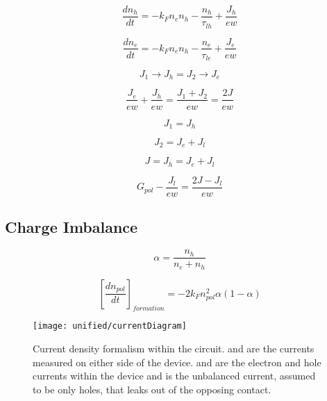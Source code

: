 \documentclass[../thesis.tex]{subfiles}
\begin{document}
\begin{equation}
\frac{dn_h}{dt}=-k_Fn_en_h-\frac{n_h}{\tau_{lh}}+\frac{J_h}{ew}
\label{eqn:hole_rate}
\end{equation}

\begin{equation}
\frac{dn_e}{dt}=-k_Fn_en_h-\frac{n_e}{\tau_{le}}+\frac{J_e}{ew}
\label{eqn:electron_rate}
\end{equation}

\begin{equation}
J_1\rightarrow J_h = J_2 \rightarrow J_e
\label{eqn:current_no_leakage}
\end{equation}

\begin{equation}
\frac{J_e}{ew}+\frac{J_h}{ew}=\frac{J_1+J_2}{ew}=\frac{2J}{ew}
\label{eqn:injected_polarons_no_leakage}
\end{equation}

\begin{equation}
J_1=J_h
\label{eqn:current_holes_leakage}
\end{equation}

\begin{equation}
J_2=J_e+J_l
\label{eqn:current_electrons_leakage}
\end{equation}

\begin{equation}
J=J_h=J_e+J_l
\label{eqn:current_continuity_leakage}
\end{equation}

\begin{equation}
G_{pol}-\frac{J_l}{ew}=\frac{2J-J_l}{ew}
\label{polaron_generation}
\end{equation}

\subsection{Charge Imbalance}

\begin{equation}
\alpha=\frac{n_h}{n_e+n_h}
\label{eqn:charge_ratio}
\end{equation}

\begin{equation}
\left[\frac{dn_{pol}}{dt}\right]_{formation}=-2k_Fn_{pol}^2\alpha(1-\alpha)
\label{eqn:exciton_formation_charge_ratio}
\end{equation}



\begin{wrapfigure}{r}{0.5\textwidth}
\centering
\texttt{[image: unified/currentDiagram]}
\caption{Current density formalism within the circuit. and are the currents measured on either side of the device. and are the electron and hole currents within the device and is the unbalanced current, assumed to be only holes, that leaks out of the opposing contact.}
\label{fig:currentDiagram}
\end{wrapfigure}
\end{document}
